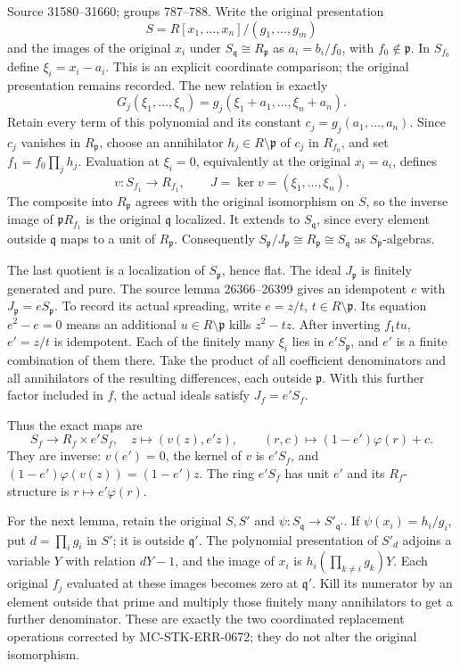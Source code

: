 Source 31580--31660; groups 787--788. Write the original presentation \[
S=R[x_1,\ldots,x_n]/(g_1,\ldots,g_m)
\] and the images of the original \(x_i\) under \(S_{\mathfrak q}\cong R_{\mathfrak p}\) as \(a_i=b_i/f_0\), with \(f_0\notin\mathfrak p\). In \(S_{f_0}\) define \(\xi_i=x_i-a_i\). This is an explicit coordinate comparison; the original presentation remains recorded. The new relation is exactly \[
G_j(\xi_1,\ldots,\xi_n)=g_j(\xi_1+a_1,\ldots,\xi_n+a_n).
\] Retain every term of this polynomial and its constant \(c_j=g_j(a_1,\ldots,a_n)\). Since \(c_j\) vanishes in \(R_{\mathfrak p}\), choose an annihilator \(h_j\in R\setminus\mathfrak p\) of \(c_j\) in \(R_{f_0}\), and set \(f_1=f_0\prod_jh_j\). Evaluation at \(\xi_i=0\), equivalently at the original \(x_i=a_i\), defines \[
v:S_{f_1}\to R_{f_1},\qquad J=\ker v=(\xi_1,\ldots,\xi_n).
\] The composite into \(R_{\mathfrak p}\) agrees with the original isomorphism on \(S\), so the inverse image of \(\mathfrak pR_{f_1}\) is the original \(\mathfrak q\) localized. It extends to \(S_{\mathfrak q}\), since every element outside \(\mathfrak q\) maps to a unit of \(R_{\mathfrak p}\). Consequently \(S_{\mathfrak p}/J_{\mathfrak p}\cong R_{\mathfrak p}\cong S_{\mathfrak q}\) as \(S_{\mathfrak p}\)-algebras.

The last quotient is a localization of \(S_{\mathfrak p}\), hence flat. The ideal \(J_{\mathfrak p}\) is finitely generated and pure. The source lemma 26366--26399 gives an idempotent \(e\) with \(J_{\mathfrak p}=eS_{\mathfrak p}\). To record its actual spreading, write \(e=z/t\), \(t\in R\setminus\mathfrak p\). Its equation \(e^2-e=0\) means an additional \(u\in R\setminus\mathfrak p\) kills \(z^2-tz\). After inverting \(f_1tu\), \(e'=z/t\) is idempotent. Each of the finitely many \(\xi_i\) lies in \(e'S_{\mathfrak p}\), and \(e'\) is a finite combination of them there. Take the product of all coefficient denominators and all annihilators of the resulting differences, each outside \(\mathfrak p\). With this further factor included in \(f\), the actual ideals satisfy \(J_f=e'S_f\).

Thus the exact maps are \[
S_f\longrightarrow R_f\times e'S_f,\quad z\longmapsto(v(z),e'z),
\qquad
(r,c)\longmapsto(1-e')\varphi(r)+c.
\] They are inverse: \(v(e')=0\), the kernel of \(v\) is \(e'S_f\), and \((1-e')\varphi(v(z))=(1-e')z\). The ring \(e'S_f\) has unit \(e'\) and its \(R_f\)-structure is \(r\mapsto e'\varphi(r)\).

For the next lemma, retain the original \(S,S'\) and \(\psi:S_{\mathfrak q}\to S'_{\mathfrak q'}\). If \(\psi(x_i)=h_i/g_i\), put \(d=\prod_i g_i\) in \(S'\); it is outside \(\mathfrak q'\). The polynomial presentation of \(S'_d\) adjoins a variable \(Y\) with relation \(dY-1\), and the image of \(x_i\) is \(h_i(\prod_{k\ne i}g_k)Y\). Each original \(f_j\) evaluated at these images becomes zero at \(\mathfrak q'\). Kill its numerator by an element outside that prime and multiply those finitely many annihilators to get a further denominator. These are exactly the two coordinated replacement operations corrected by MC-STK-ERR-0672; they do not alter the original isomorphism.

